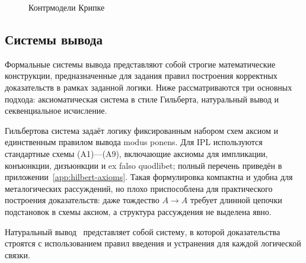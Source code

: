\documentclass[14pt, russian]{scrartcl}
\begin{document}
\begin{figure}[!htb]
\centering
{}\hfill
{}
\caption{Контрмодели Крипке}
\label{fig:kripke-countermodels}
\end{figure}

\subsection{Системы вывода}

Формальные системы вывода представляют собой строгие математические конструкции,
предназначенные для задания правил построения корректных доказательств в рамках
заданной логики. Ниже рассматриваются три основных подхода: аксиоматическая
система в стиле Гильберта, натуральный вывод и секвенциальное исчисление.

Гильбертова система задаёт логику фиксированным набором схем аксиом и единственным
правилом вывода modus ponens. Для IPL используются стандартные схемы (A1)---(A9),
включающие аксиомы для импликации, конъюнкции, дизъюнкции и ex falso quodlibet;
полный перечень приведён в приложении~\ref{app:hilbert-axioms}. Такая формулировка компактна и удобна для металогических рассуждений, но плохо
приспособлена для практического построения доказательств: даже тождество
$A \rightarrow A$ требует длинной цепочки подстановок в схемы аксиом, а структура
рассуждения не выделена явно.

Натуральный вывод~\cite{Gentzen1935} представляет собой систему, в которой доказательства строятся
с использованием правил введения и устранения для каждой логической связки.
\end{document}
